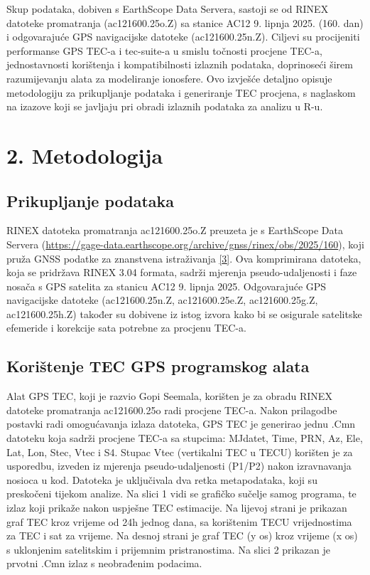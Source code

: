 \documentclass[
]{article}
\begin{document}
Skup podataka, dobiven s EarthScope Data Servera, sastoji se od RINEX
datoteke promatranja (ac121600.25o.Z) sa stanice AC12 9. lipnja 2025.
(160. dan) i odgovarajuće GPS navigacijske datoteke (ac121600.25n.Z).
Ciljevi su procijeniti performanse GPS TEC-a i tec-suite-a u smislu
točnosti procjene TEC-a, jednostavnosti korištenja i kompatibilnosti
izlaznih podataka, doprinoseći širem razumijevanju alata za modeliranje
ionosfere. Ovo izvješće detaljno opisuje metodologiju za prikupljanje
podataka i generiranje TEC procjena, s naglaskom na izazove koji se
javljaju pri obradi izlaznih podataka za analizu u R-u.

\section{2. Metodologija}\label{metodologija}

\subsection{Prikupljanje podataka}\label{prikupljanje-podataka}

RINEX datoteka promatranja ac121600.25o.Z preuzeta je s EarthScope Data
Servera
(\url{https://gage-data.earthscope.org/archive/gnss/rinex/obs/2025/160}),
koji pruža GNSS podatke za znanstvena istraživanja
\hyperref[izvori]{{[}3{]}}. Ova komprimirana datoteka, koja se pridržava
RINEX 3.04 formata, sadrži mjerenja pseudo-udaljenosti i faze nosača s
GPS satelita za stanicu AC12 9. lipnja 2025. Odgovarajuće GPS
navigacijske datoteke (ac121600.25n.Z, ac121600.25e.Z, ac121600.25g.Z,
ac121600.25h.Z) također su dobivene iz istog izvora kako bi se osigurale
satelitske efemeride i korekcije sata potrebne za procjenu TEC-a.

\subsection{Korištenje TEC GPS programskog
alata}\label{koriux161tenje-tec-gps-programskog-alata}

Alat GPS TEC, koji je razvio Gopi Seemala, korišten je za obradu RINEX
datoteke promatranja ac121600.25o radi procjene TEC-a. Nakon prilagodbe
postavki radi omogućavanja izlaza datoteka, GPS TEC je generirao jednu
.Cmn datoteku koja sadrži procjene TEC-a sa stupcima: MJdatet, Time,
PRN, Az, Ele, Lat, Lon, Stec, Vtec i S4. Stupac Vtec (vertikalni TEC u
TECU) korišten je za usporedbu, izveden iz mjerenja pseudo-udaljenosti
(P1/P2) nakon izravnavanja nosioca u kod. Datoteka je uključivala dva
retka metapodataka, koji su preskočeni tijekom analize. Na slici 1 vidi
se grafičko sučelje samog programa, te izlaz koji prikaže nakon uspješne
TEC estimacije. Na lijevoj strani je prikazan graf TEC kroz vrijeme od
24h jednog dana, sa korištenim TECU vrijednostima za TEC i sat za
vrijeme. Na desnoj strani je graf TEC (y os) kroz vrijeme (x os) s
uklonjenim satelitskim i prijemnim pristranostima. Na slici 2 prikazan
je prvotni .Cmn izlaz s neobrađenim podacima.
\end{document}
